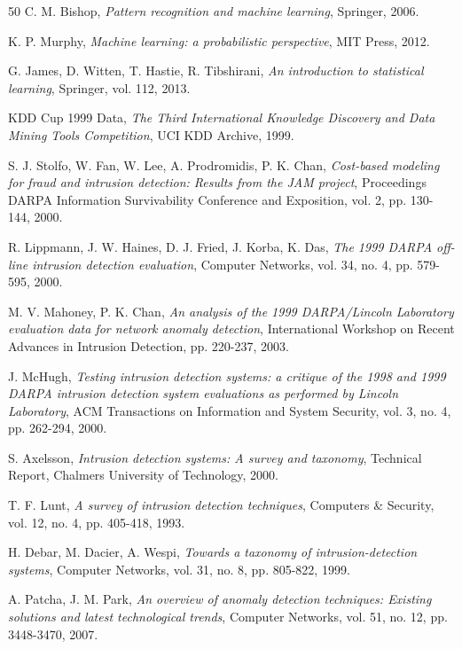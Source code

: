 \begin{thebibliography}{50}
C. M. Bishop, 
\textit{Pattern recognition and machine learning}, 
Springer, 2006.

K. P. Murphy, 
\textit{Machine learning: a probabilistic perspective}, 
MIT Press, 2012.

G. James, D. Witten, T. Hastie, R. Tibshirani, 
\textit{An introduction to statistical learning}, 
Springer, vol. 112, 2013.

KDD Cup 1999 Data, 
\textit{The Third International Knowledge Discovery and Data Mining Tools Competition}, 
UCI KDD Archive, 1999.

S. J. Stolfo, W. Fan, W. Lee, A. Prodromidis, P. K. Chan, 
\textit{Cost-based modeling for fraud and intrusion detection: Results from the JAM project}, 
Proceedings DARPA Information Survivability Conference and Exposition, vol. 2, pp. 130-144, 2000.

R. Lippmann, J. W. Haines, D. J. Fried, J. Korba, K. Das, 
\textit{The 1999 DARPA off-line intrusion detection evaluation}, 
Computer Networks, vol. 34, no. 4, pp. 579-595, 2000.

M. V. Mahoney, P. K. Chan, 
\textit{An analysis of the 1999 DARPA/Lincoln Laboratory evaluation data for network anomaly detection}, 
International Workshop on Recent Advances in Intrusion Detection, pp. 220-237, 2003.

J. McHugh, 
\textit{Testing intrusion detection systems: a critique of the 1998 and 1999 DARPA intrusion detection system evaluations as performed by Lincoln Laboratory}, 
ACM Transactions on Information and System Security, vol. 3, no. 4, pp. 262-294, 2000.

S. Axelsson, 
\textit{Intrusion detection systems: A survey and taxonomy}, 
Technical Report, Chalmers University of Technology, 2000.

T. F. Lunt, 
\textit{A survey of intrusion detection techniques}, 
Computers \& Security, vol. 12, no. 4, pp. 405-418, 1993.

H. Debar, M. Dacier, A. Wespi, 
\textit{Towards a taxonomy of intrusion-detection systems}, 
Computer Networks, vol. 31, no. 8, pp. 805-822, 1999.

A. Patcha, J. M. Park, 
\textit{An overview of anomaly detection techniques: Existing solutions and latest technological trends}, 
Computer Networks, vol. 51, no. 12, pp. 3448-3470, 2007.


\end{thebibliography}
